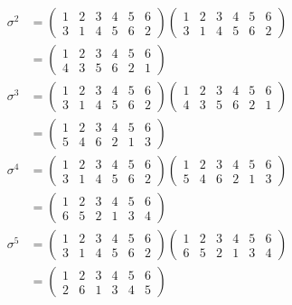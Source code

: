 \documentclass[12pt]{article}
\begin{document}
\begin{problem}[8.6]
\begin{align*}
	\sigma^2 &=  \begin{pmatrix} 1&2&3&4&5&6\\3&1&4&5&6&2 \end{pmatrix} \begin{pmatrix} 1&2&3&4&5&6\\3&1&4&5&6&2 \end{pmatrix} \\
	&= \begin{pmatrix} 1&2&3&4&5&6\\4&3&5&6&2&1 \end{pmatrix}  \\
	\sigma^3 &= \begin{pmatrix} 1&2&3&4&5&6\\3&1&4&5&6&2\end{pmatrix} \begin{pmatrix} 1&2&3&4&5&6\\4&3&5&6&2&1 \end{pmatrix}  \\
           &= \begin{pmatrix} 1&2&3&4&5&6\\5&4&6&2&1&3 \end{pmatrix}  \\
	   \sigma^{4}&= \begin{pmatrix} 1&2&3&4&5&6\\3&1&4&5&6&2\end{pmatrix} \begin{pmatrix} 1&2&3&4&5&6\\5&4&6&2&1&3 \end{pmatrix} \\
	   &= \begin{pmatrix} 1&2&3&4&5&6\\6&5&2&1&3&4 \end{pmatrix}  \\
	   \sigma^{5} &= \begin{pmatrix} 1&2&3&4&5&6\\ 3&1&4&5&6&2\end{pmatrix}  \begin{pmatrix} 1&2&3&4&5&6\\6&5&2&1&3&4 \end{pmatrix}  \\
	   &= \begin{pmatrix} 1&2&3&4&5&6\\2&6&1&3&4&5 \end{pmatrix}  \\

\end{align*}
\end{problem}
\end{document}
